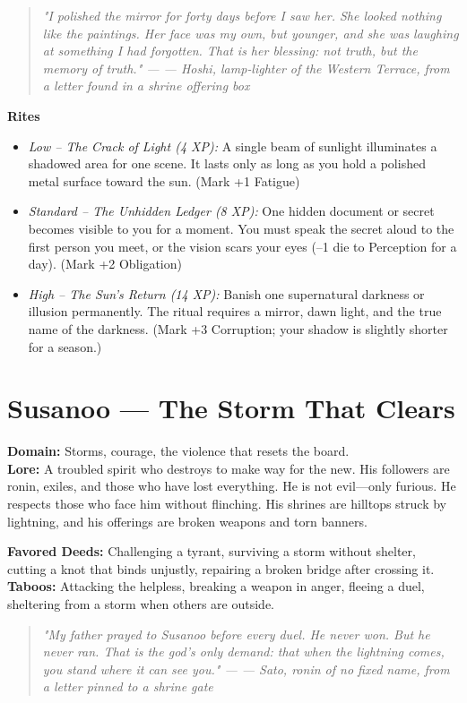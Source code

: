 \documentclass[12pt]{book}
\newcommand{\letter}[2]{%
    \begin{quote}\small\itshape #1 \hfill --- #2\end{quote}}
\begin{document}
\letter{"I polished the mirror for forty days before I saw her. She looked nothing like the paintings. Her face was my own, but younger, and she was laughing at something I had forgotten. That is her blessing: not truth, but the memory of truth."}{--- Hoshi, lamp‑lighter of the Western Terrace, from a letter found in a shrine offering box}

\begin{infobox}
\textbf{Rites}
\begin{itemize}
    \item \textit{Low -- The Crack of Light (4 XP):} A single beam of sunlight illuminates a shadowed area for one scene. It lasts only as long as you hold a polished metal surface toward the sun. (Mark +1 Fatigue)
    \item \textit{Standard -- The Unhidden Ledger (8 XP):} One hidden document or secret becomes visible to you for a moment. You must speak the secret aloud to the first person you meet, or the vision scars your eyes (--1 die to Perception for a day). (Mark +2 Obligation)
    \item \textit{High -- The Sun's Return (14 XP):} Banish one supernatural darkness or illusion permanently. The ritual requires a mirror, dawn light, and the true name of the darkness. (Mark +3 Corruption; your shadow is slightly shorter for a season.)
\end{itemize}
\end{infobox}

\section{Susanoo --- The Storm That Clears}
\noindent\textbf{Domain:} Storms, courage, the violence that resets the board.\\
\textbf{Lore:} A troubled spirit who destroys to make way for the new. His followers are ronin, exiles, and those who have lost everything. He is not evil---only furious. He respects those who face him without flinching. His shrines are hilltops struck by lightning, and his offerings are broken weapons and torn banners.

\textbf{Favored Deeds:} Challenging a tyrant, surviving a storm without shelter, cutting a knot that binds unjustly, repairing a broken bridge after crossing it.\\
\textbf{Taboos:} Attacking the helpless, breaking a weapon in anger, fleeing a duel, sheltering from a storm when others are outside.

\letter{"My father prayed to Susanoo before every duel. He never won. But he never ran. That is the god's only demand: that when the lightning comes, you stand where it can see you."}{--- Sato, ronin of no fixed name, from a letter pinned to a shrine gate}
\end{document}
